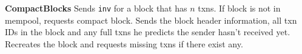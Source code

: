 


{\begin{myprot}{\textbf{CompactBlocks}}
\label{protocol:compact}
\STATE \sender Sends {\tt inv} for a block that has $n$ txns.
\STATE \recvr If block is not in mempool, requests compact block.
\STATE \sender Sends the block header information, all txn IDs in the block and any full txns he predicts the sender hasn't received yet.
\STATE \recvr Recreates the block and requests missing txns if there exist any.
\end{myprot}}

